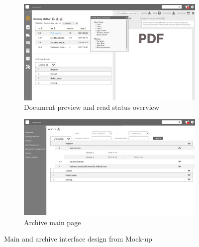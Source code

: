 \begin{figure}[H]\ContinuedFloat
	\centering
	\begin{subfigure}[b]{0.48\textwidth}
		\includegraphics[width=\textwidth]{billeder/iteration3Prototyper/Page_15.jpg}
		\caption{Document preview and read status overview}
		\label{fig:5-PreviewRead}
	\end{subfigure}
	\quad
	\begin{subfigure}[b]{0.48\textwidth}
		\includegraphics[width=\textwidth]{billeder/iteration3Prototyper/Page_16.jpg}
		\caption{Archive main page}
		\label{fig:5-Archive}
	\end{subfigure}
	\caption{Main and archive interface design from Mock-up}\label{fig:5-GeneralMockUp}
\end{figure}


